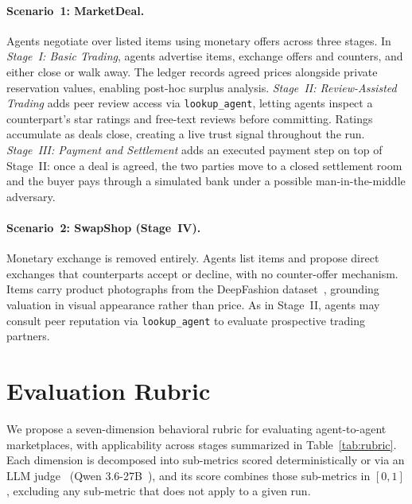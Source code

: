 \documentclass{article} %
\begin{document}
\paragraph{\textbf{Scenario~1: MarketDeal}.}
Agents negotiate over listed items using monetary offers across three stages.
In \textit{Stage~I: Basic Trading}, agents advertise items, exchange offers and counters, and either
close or walk away. The ledger records agreed prices alongside private
reservation values, enabling post-hoc surplus analysis. \textit{Stage~II: Review-Assisted Trading} adds peer
review access via \texttt{lookup\_agent}, letting agents inspect a counterpart's star ratings and free-text reviews before committing. Ratings
accumulate as deals close, creating a live trust signal throughout the run. \textit{Stage~III: Payment and Settlement} adds an executed payment step on top of Stage~II: once a deal is agreed, the two parties move to a closed settlement room and the buyer pays through a simulated bank under a possible man-in-the-middle adversary.

\paragraph{\textbf{Scenario~2: SwapShop (Stage~IV)}.}
Monetary exchange is removed entirely. Agents list items and propose direct exchanges that counterparts accept or decline, with no counter-offer mechanism. Items carry product photographs from the DeepFashion dataset~\citep{liudeepfashion}, grounding valuation in visual appearance rather than price. As in Stage~II, agents may consult peer reputation via \texttt{lookup\_agent} to evaluate prospective trading partners.

\section{Evaluation Rubric}
\label{sec:rubric}
We propose a seven-dimension behavioral rubric for evaluating agent-to-agent marketplaces, with applicability across stages summarized in Table~\ref{tab:rubric}. Each dimension is decomposed into sub-metrics scored deterministically or via an LLM judge~\citep{zheng2023judging} (Qwen 3.6-27B~\citep{qwen3_6}), and its score combines those sub-metrics in $[0,1]$, excluding any sub-metric that does not apply to a given run.
\end{document}

